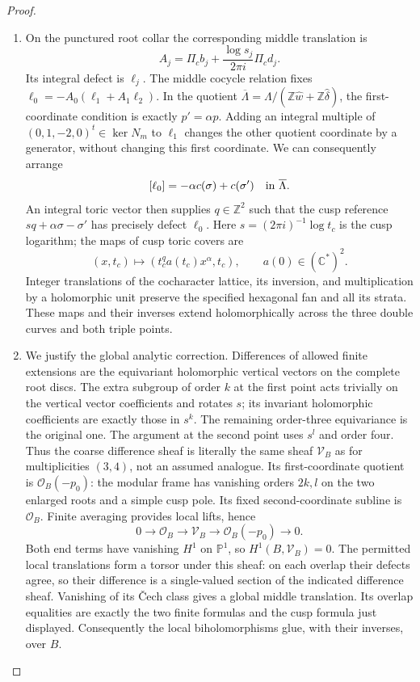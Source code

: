 \begin{proof}
\begin{enumerate}[label=\arabic*.,leftmargin=*]
\item On the punctured root collar the corresponding middle translation is
\[
 A_j=\Pi_cb_j+\frac{\log s_j}{2\pi i}\Pi_cd_j.
\]
Its integral defect is $\ell_j$.  The middle cocycle relation fixes
$\ell_0=-A_0(\ell_1+A_1\ell_2)$.  In the quotient
$\overline\Lambda=\Lambda/(\mathbb Z\widehat w+\mathbb Z\widehat\delta)$,
the first-coordinate condition is exactly $p'=\alpha p$.
Adding an integral multiple of $(0,1,-2,0)^t\in\ker N_m$ to
$\ell_1$ changes the other quotient coordinate by a generator,
without changing this first coordinate.  We can consequently arrange
\[
 [\ell_0]=-\alpha c(\sigma)+c(\sigma')\quad\hbox{in }\overline\Lambda.
\]
An integral toric vector then supplies $q\in\mathbb Z^2$ such that
the cusp reference $sq+\alpha\sigma-\sigma'$ has precisely defect
$\ell_0$.  Here $s=(2\pi i)^{-1}\log t_c$ is the cusp logarithm;
the maps of cusp toric covers are
\[
 (x,t_c)\longmapsto(t_c^q a(t_c)x^\alpha,t_c),
 \qquad a(0)\in(\mathbb C^*)^2.
\]
Integer translations of the cocharacter lattice, its inversion,
and multiplication by a holomorphic unit preserve the specified
hexagonal fan and all its strata.  These maps and their inverses
extend holomorphically across the three double curves and both
triple points.

\item We justify the global analytic correction.  Differences of allowed
finite extensions are the equivariant holomorphic vertical vectors
on the complete root discs.  The extra subgroup of order $k$ at
the first point acts trivially on the vertical vector coefficients
and rotates $s$; its invariant holomorphic coefficients are exactly
those in $s^k$.  The remaining order-three equivariance is the
original one.  The argument at the second point uses $s^l$ and
order four.  Thus the coarse difference sheaf is literally the same
sheaf $\mathcal V_B$ as for multiplicities $(3,4)$, not an assumed
analogue.  Its first-coordinate quotient is
$\mathcal O_B(-p_0)$: the modular frame has vanishing orders $2k,l$
on the two enlarged roots and a simple cusp pole.  Its fixed
second-coordinate subline is $\mathcal O_B$.  Finite averaging
provides local lifts, hence
\[
 0\longrightarrow\mathcal O_B\longrightarrow\mathcal V_B
 \longrightarrow\mathcal O_B(-p_0)\longrightarrow0.
\]
Both end terms have vanishing $H^1$ on $\mathbb P^1$, so
$H^1(B,\mathcal V_B)=0$.  The permitted local translations form a
torsor under this sheaf: on each overlap their defects agree, so
their difference is a single-valued section of the indicated
difference sheaf.  Vanishing of its \v Cech class gives a global
middle translation.  Its overlap equalities are exactly the two
finite formulas and the cusp formula just displayed.  Consequently
the local biholomorphisms glue, with their inverses, over $B$.


\end{enumerate}
\end{proof}
